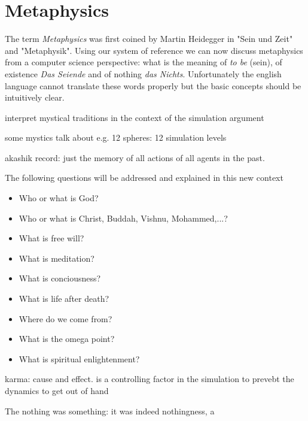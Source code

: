 \section{Metaphysics}
The term \textit{Metaphysics} was first coined by Martin Heidegger in "Sein und Zeit" and "Metaphysik". Using our system of reference we can now discuss metaphysics from a computer science perspective: what is the meaning of \textit{to be} (sein), of existence \textit{Das Seiende} and of nothing \textit{das Nichts}. Unfortunately the english language cannot translate these words properly but the basic concepts should be intuitively clear.

interpret mystical traditions in the context of the simulation argument

some mystics talk about e.g. 12 spheres: 12 simulation levels

akashik record: just the memory of all actions of all agents in the past.

The following questions will be addressed and explained in this new context

\begin{itemize}
\item Who or what is God?
\item Who or what is Christ, Buddah, Vishnu, Mohammed,...?
\item What is free will? 
\item What is meditation?
\item What is conciousness?
\item What is life after death?
\item Where do we come from?
\item What is the omega point?
\item What is spiritual enlightenment?
\end{itemize}

karma: cause and effect. is a controlling factor in the simulation to prevebt the dynamics to get out of hand

The nothing was something: it was indeed nothingness, a